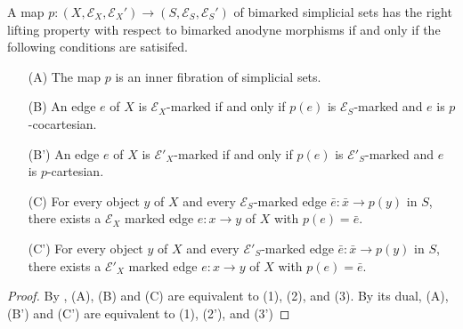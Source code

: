 \documentclass[main.tex]{subfiles}
\begin{document}
\begin{proposition}
  \label{prop:rlp_bimarked_anodyne}
  A map $p\colon (X, \mathcal{E}_{X}, \mathcal{E}_{X}') \to (S, \mathcal{E}_{S}, \mathcal{E}_{S}')$ of bimarked simplicial sets has the right lifting property with respect to bimarked anodyne morphisms if and only if the following conditions are satisifed.
  \begin{enumerate}
    \item[(A)] The map $p$ is an inner fibration of simplicial sets.

    \item[(B)] An edge $e$ of $X$ is $\mathcal{E}_{X}$-marked if and only if $p(e)$ is $\mathcal{E}_{S}$-marked and $e$ is $p$-cocartesian.

    \item[(B')] An edge $e$ of $X$ is $\mathcal{E}'_{X}$-marked if and only if $p(e)$ is $\mathcal{E}'_{S}$-marked and $e$ is $p$-cartesian.

    \item[(C)] For every object $y$ of $X$ and every $\mathcal{E}_{S}$-marked edge $\bar{e}\colon \bar{x} \to p(y)$ in $S$, there exists a $\mathcal{E}_{X}$ marked edge $e\colon x \to y$ of $X$ with $p(e) = \bar{e}$.

    \item[(C')] For every object $y$ of $X$ and every $\mathcal{E}'_{S}$-marked edge $\bar{e}\colon \bar{x} \to p(y)$ in $S$, there exists a $\mathcal{E}'_{X}$ marked edge $e\colon x \to y$ of $X$ with $p(e) = \bar{e}$.
  \end{enumerate}
\end{proposition}
\begin{proof}
  By \cite[Prop.\ 3.1.1.6]{highertopostheory}, (A), (B) and (C) are equivalent to (1), (2), and (3). By its dual, (A), (B') and (C') are equivalent to (1), (2'), and (3')
\end{proof}
\end{document}
